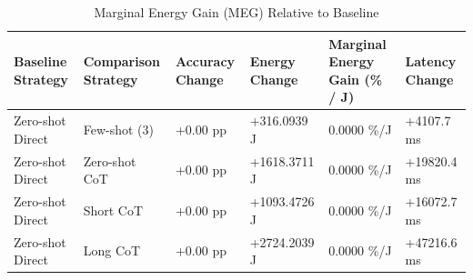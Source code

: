 \begin{table}
\caption{Marginal Energy Gain (MEG) Relative to Baseline}
\label{tab:marginal_energy_gain}
\begin{tabular}{llllll}
\toprule
Baseline Strategy & Comparison Strategy & Accuracy Change & Energy Change & Marginal Energy Gain (\% / J) & Latency Change \\
\midrule
Zero-shot Direct & Few-shot (3) & +0.00 pp & +316.0939 J & 0.0000 \%/J & +4107.7 ms \\
Zero-shot Direct & Zero-shot CoT & +0.00 pp & +1618.3711 J & 0.0000 \%/J & +19820.4 ms \\
Zero-shot Direct & Short CoT & +0.00 pp & +1093.4726 J & 0.0000 \%/J & +16072.7 ms \\
Zero-shot Direct & Long CoT & +0.00 pp & +2724.2039 J & 0.0000 \%/J & +47216.6 ms \\
\bottomrule
\end{tabular}
\end{table}
